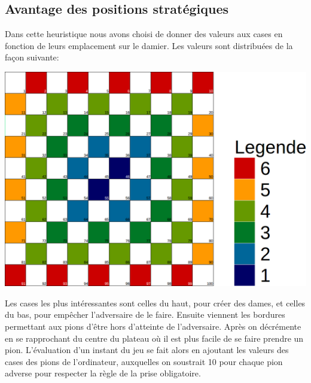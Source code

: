 \documentclass[10pt,a4paper]{report}
\begin{document}
	\subsection{Avantage des positions stratégiques}
		Dans cette heuristique nous avons choisi de donner des valeurs aux cases en fonction de leurs emplacement sur le damier. Les valeurs sont distribuées de la façon suivante:
		\begin{center}
			\includegraphics[scale=0.2]{valeursDamier.png}
		\end{center}
		Les cases les plus intéressantes sont celles du haut, pour créer des dames, et celles du bas, pour empêcher l'adversaire de le faire. Ensuite viennent les bordures permettant aux pions d'être hors d'atteinte de l'adversaire. Après on décrémente en se rapprochant du centre du plateau où il est plus facile de se faire prendre un pion.
		L'évaluation d'un instant du jeu se fait alors en ajoutant les valeurs des cases des pions de l'ordinateur, auxquelles on soustrait 10 pour chaque pion adverse pour respecter la règle de la prise obligatoire.
\end{document}
